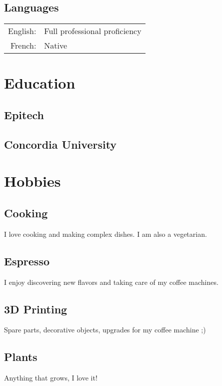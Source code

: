 \documentclass[
  english,
  a4paper
]{resume-openfont}
\begin{document}
\begin{minipage}[t]{0.31\textwidth}
\subsection{Languages}
\vspace{2pt}
\begin{tabular}{@{}r@{\hskip 0.5em}l}
English: &Full professional proficiency \\
French: &Native
\end{tabular}

\vspace{4pt}


\section{Education}

\subsection{Epitech}
\subtitle{Master in Computer Science\\Valedictorian}
\sectionsep

\subsection{Concordia University}
\subtitle{Visiting student in Computer Sciences, Graduate Level}


\section{Hobbies}

\subsection{Cooking}
I love cooking and making complex dishes. I am also a vegetarian.

\sectionsep
\subsection{Espresso}
I enjoy discovering new flavors and taking care of my coffee machines.

\sectionsep
\subsection{3D Printing}
Spare parts, decorative objects, upgrades for my coffee machine ;)

\sectionsep
\subsection{Plants}
Anything that grows, I love it!

%
%
\end{minipage}%
\end{document}
